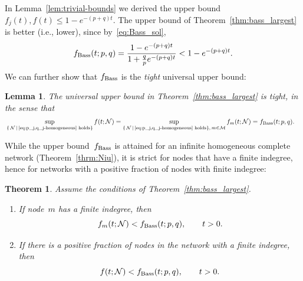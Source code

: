 \documentclass[review]{elsarticle}
\newtheorem{theorem}{Theorem}
\newtheorem{lemma}{Lemma}
\begin{document}
 In Lemma~\ref{lem:trivial-bounds} we derived the upper bound
$
f_j(t), f(t) \le 1- e^{-(p+q)t}$.
The upper bound
of Theorem~\ref{thm:bass_largest} is better (i.e., lower), since by~\eqref{eq:Bass_sol},
$$
f_{\rm Bass}(t;p,q)=\frac{1-e^{-(p+q)t}}{1+\frac{q}{p}e^{-(p+q)t}}< 1- e^{-(p+q)t}.
$$ 
We can further show that $f_{\rm Bass}$ is the {\em tight} universal upper bound:
\begin{lemma}
	\label{lem:f_Bass-is-tight}
	The universal upper bound in Theorem~\ref{thm:bass_largest} is tight, in the sense that
	\begin{eqnarray*}
	&\sup_{\{ \, {\cal N} \, | \, \text{\eqref{eq:p_j,q_j-homogeneous} holds}\}} f(t;{\cal N})
	 =
	  \sup_{\{ \, {\cal N} \, | \, \text{\eqref{eq:p_j,q_j-homogeneous} holds}\}, \, m \in \cal M} f_m(t;{\cal N}) = f_{\rm Bass}(t;p,q).
	\end{eqnarray*}	
\end{lemma}
  While the upper bound~$f_{\rm Bass}$ is attained for an infinite homogeneous complete network (Theorem~\ref{thrm:Niu}), it is strict for nodes that have a finite indegree, hence for networks with a positive fraction of nodes with finite indegree:
 \begin{theorem}
	\label{thm:f<f_Bass}
Assume the conditions of Theorem~\ref{thm:bass_largest}. 
\begin{enumerate}
\item   If node~$m$ has a finite indegree,
	then 
	\begin{equation}
		\label{eq:f_m<f_Bass}
		f_m(t;{\cal N}) < f_{\rm Bass}(t;p,q), \qquad t>0.
	\end{equation}

\item If there is a positive fraction of nodes  in the network with a finite indegree, then
\begin{equation}
	 \label{eq:f<f_Bass=thm}
	f(t;{\cal N}) < f_{\rm Bass}(t;p,q), \qquad t > 0.
\end{equation}
\end{enumerate}
\end{theorem}
  
\end{document}
